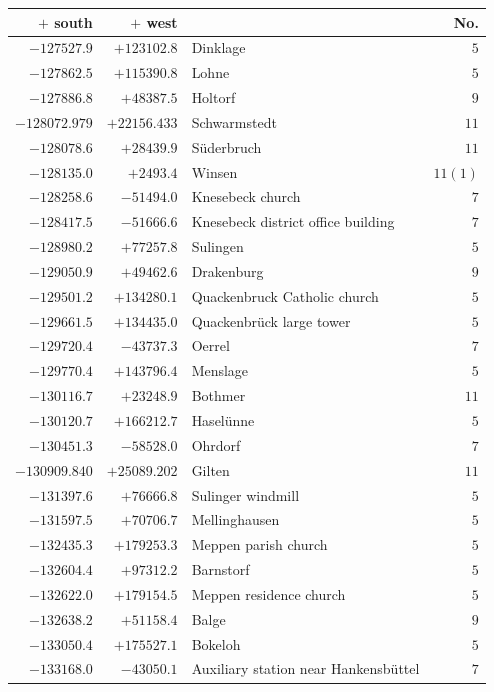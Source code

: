\clearpage{}%
\begin{center}\begingroup\fontsize{8}{9}\selectfont
\setlength{\tabcolsep}{4pt}
\begin{tabular}{r|r|p{170pt}|r}\hline
\(+\) south&\(+\) west&&No.\\\hline
\(-127527.9\)&\(+123102.8\)&Dinklage&\(5\)\\
\(-127862.5\)&\(+115390.8\)&Lohne&\(5\)\\
\(-127886.8\)&\(+48387.5\)&Holtorf&\(9\)\\
\(-128072.979\)&\(+22156.433\)&Schwarmstedt&\(11\)\\
\(-128078.6\)&\(+28439.9\)&Süderbruch&\(11\)\\
\(-128135.0\)&\(+2493.4\)&Winsen&\(11 (1)\)\\
\(-128258.6\)&\(-51494.0\)&Knesebeck church&\(7\)\\
\(-128417.5\)&\(-51666.6\)&Knesebeck district office building&\(7\)\\
\(-128980.2\)&\(+77257.8\)&Sulingen&\(5\)\\
\(-129050.9\)&\(+49462.6\)&Drakenburg&\(9\)\\
\(-129501.2\)&\(+134280.1\)&Quackenbruck Catholic church&\(5\)\\
\(-129661.5\)&\(+134435.0\)&Quackenbrück large tower&\(5\)\\
\(-129720.4\)&\(-43737.3\)&Oerrel&\(7\)\\
\(-129770.4\)&\(+143796.4\)&Menslage&\(5\)\\
\(-130116.7\)&\(+23248.9\)&Bothmer&\(11\)\\
\(-130120.7\)&\(+166212.7\)&Haselünne&\(5\)\\
\(-130451.3\)&\(-58528.0\)&Ohrdorf&\(7\)\\
\(-130909.840\)&\(+25089.202\)&Gilten&\(11\)\\
\(-131397.6\)&\(+76666.8\)&Sulinger windmill&\(5\)\\
\(-131597.5\)&\(+70706.7\)&Mellinghausen&\(5\)\\
\(-132435.3\)&\(+179253.3\)&Meppen parish church&\(5\)\\
\(-132604.4\)&\(+97312.2\)&Barnstorf&\(5\)\\
\(-132622.0\)&\(+179154.5\)&Meppen residence church&\(5\)\\
\(-132638.2\)&\(+51158.4\)&Balge&\(9\)\\
\(-133050.4\)&\(+175527.1\)&Bokeloh&\(5\)\\
\(-133168.0\)&\(-43050.1\)&Auxiliary station near Hankensbüttel&\(7\)\\

\end{tabular}
\end{center}
